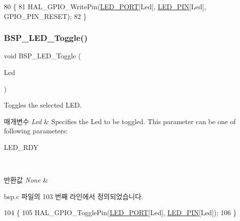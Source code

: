\begin{DoxyCode}
80 \{
81   HAL\_GPIO\_WritePin(\mbox{\hyperlink{bsp_8c_a1127c0cf12e4ec7a66f2a64cd7407218}{LED\_PORT}}[Led], \mbox{\hyperlink{bsp_8c_a51722a2d3aff3970f123a94ac62b908f}{LED\_PIN}}[Led], GPIO\_PIN\_RESET); 
82 \}
\end{DoxyCode}
\mbox{\label{group___lory_s_d_k___l_e_d___functions_ga1b9eabba7d498f41d6f16587ec0f9732}} 
\subsubsection{\texorpdfstring{B\+S\+P\+\_\+\+L\+E\+D\+\_\+\+Toggle()}{BSP\_LED\_Toggle()}}
{\footnotesize\ttfamily void B\+S\+P\+\_\+\+L\+E\+D\+\_\+\+Toggle (\begin{DoxyParamCaption}\item[{\mbox{\hyperlink{_lory_s_d_k__hw__conf_8h_aa059704b7ca945eb9c1e7f2c3d03fecd}{Led\+\_\+\+Type\+Def}}}]{Led }\end{DoxyParamCaption})}



Toggles the selected L\+ED. 


\begin{DoxyParams}{매개변수}
{\em Led} & Specifies the Led to be toggled. This parameter can be one of following parameters\+: \begin{DoxyItemize}
\item L\+E\+D\+\_\+\+R\+DY \end{DoxyItemize}
\\
\hline
\end{DoxyParams}

\begin{DoxyRetVals}{반환값}
{\em None} & \\
\hline
\end{DoxyRetVals}


bsp.\+c 파일의 103 번째 라인에서 정의되었습니다.


\begin{DoxyCode}
104 \{
105   HAL\_GPIO\_TogglePin(\mbox{\hyperlink{bsp_8c_a1127c0cf12e4ec7a66f2a64cd7407218}{LED\_PORT}}[Led], \mbox{\hyperlink{bsp_8c_a51722a2d3aff3970f123a94ac62b908f}{LED\_PIN}}[Led]);
106 \}
\end{DoxyCode}
